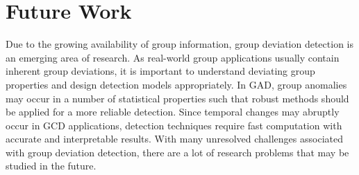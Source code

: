      \section{ Future Work}
Due to the growing availability of group information, group deviation detection is an emerging area of research.
 As real-world group applications usually contain inherent group deviations, it is important to understand deviating group properties and design detection models appropriately. In GAD,  group anomalies may occur in a number of statistical properties such that robust
methods should be applied for a more reliable detection. Since temporal changes may  abruptly occur in GCD applications,  detection techniques require fast computation with accurate and  interpretable results. With many unresolved challenges associated with group deviation detection, there are a lot of research problems  that may be studied in the future. 

